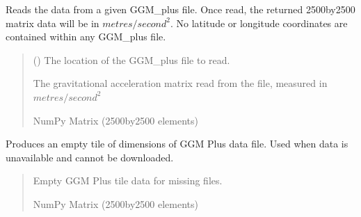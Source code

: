 \documentclass[letterpaper,10pt,english]{sphinxmanual}
\begin{document}

\begin{fulllineitems}
\label{\detokenize{modules/gravity/ggm_plus:qnav.gravity.ggm_plus.read_ggm_file}}
\pysigstartsignatures
{}
\pysigstopsignatures
\sphinxAtStartPar
Reads the data from a given GGM\_plus file. Once read, the returned
2500\sphinxhyphen{}by\sphinxhyphen{}2500 matrix data will be in \(metres/second^2\). No latitude
or longitude coordinates are contained within any GGM\_plus file.
\begin{quote}\begin{description}
\sphinxAtStartPar
{} () \textendash{} The location of the GGM\_plus file to read.

\sphinxAtStartPar
The gravitational acceleration matrix read from the file,
measured in \(metres/second^2\)

\sphinxAtStartPar
NumPy Matrix (2500\sphinxhyphen{}by\sphinxhyphen{}2500 elements)

\end{description}\end{quote}

\end{fulllineitems}


\begin{fulllineitems}
\label{\detokenize{modules/gravity/ggm_plus:qnav.gravity.ggm_plus.get_empty_ggm_tile}}
\pysigstartsignatures
{}
\pysigstopsignatures
\sphinxAtStartPar
Produces an empty tile of dimensions of GGM Plus data file.
Used when data is unavailable and cannot be downloaded.
\begin{quote}\begin{description}
\sphinxAtStartPar
Empty GGM Plus tile data for missing files.

\sphinxAtStartPar
NumPy Matrix (2500\sphinxhyphen{}by\sphinxhyphen{}2500 elements)

\end{description}\end{quote}

\end{fulllineitems}
\end{document}
